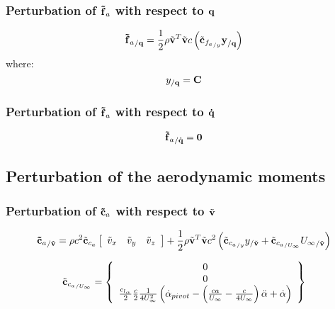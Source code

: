\subsubsection{Perturbation of $\bm{\mathbf{\tilde{f}}}_a$ with respect to $\bm{\mathbf{q}}$}
\begin{equation}
{\bm{\mathbf{\tilde{f}}}_a}_{/\bm{\mathbf{q}}} = 
	\frac{1}{2} \rho \tilde{\bm{\mathbf{v}}}^T \tilde{\bm{\mathbf{v}}} c
	\left(  \tilde{\bm{\mathbf{c}}}_{{f_{a}}_{/y}} \bm{\mathbf{y}}_{/\bm{\mathbf{q}}}  \right) 
\end{equation}
where:
\begin{equation}
y_{/\bm{\mathbf{q}}} = \bm{\mathbf{C}} 
\end{equation}

\subsubsection{Perturbation of $\bm{\mathbf{\tilde{f}}}_a$ with respect to $\bm{\mathbf{\dot{q}}}$}
\begin{equation}
{\bm{\mathbf{\tilde{f}}}_a}_{/\bm{\mathbf{\dot{q}}}} = \bm{\mathbf{0}}
\end{equation}

\subsection{Perturbation of the aerodynamic moments}
\subsubsection{Perturbation of $\bm{\mathbf{\tilde{c}}}_a$ with respect to $\tilde{\bm{\mathbf{v}}}$}
		
\begin{equation}
{\bm{\mathbf{\tilde{c}}}_a}_{/\tilde{\bm{\mathbf{v}}}} = 
	\rho c^2 \tilde{\bm{\mathbf{c}}}_{c_{a}} \left[
		\begin{array}{ccc}
			\tilde{v}_x & \tilde{v}_y & \tilde{v}_z
		\end{array} \right] +
	\frac{1}{2} \rho \tilde{\bm{\mathbf{v}}}^T \tilde{\bm{\mathbf{v}}} c^2
	\left(  \tilde{\bm{\mathbf{c}}}_{{c_{a}}_{/y}} y_{/\tilde{\bm{\mathbf{v}}}} + 
	\tilde{\bm{\mathbf{c}}}_{{c_{a}}_{/U_{\infty}}} {U_\infty}_{/\tilde{\bm{\mathbf{v}}}}  \right) 
\end{equation}

\begin{equation}
\tilde{\bm{\mathbf{c}}}_{{c_{a}}_{/U_{\infty}}} = \left\{
	\begin{array}{c}
		0 \\
		0 \\
		\frac{c_{l_{\alpha}}}{2} \frac{c}{2} \frac{1}{4 U_\infty^2} 
		\left(  \dot{\alpha}_{pivot} - \left(  \frac{c a}{U_\infty} - \frac{c}{4 U_\infty}  \right) \ddot{\alpha} + \dot{\alpha} \right)
	\end{array} \right\}
\end{equation}

